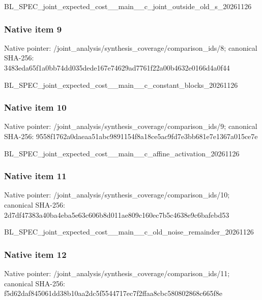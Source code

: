 \documentclass[10pt,a4paper]{article}
\begin{document}
BL\_SPEC\_joint\_expected\_c\allowbreak{}ost\_\_main\_\_c\_joint\_outsi\allowbreak{}de\_old\_s\_20261126


\subsubsection{Native item 9}


Native pointer: /joint\_analysis/synthesi\allowbreak{}s\_coverage/comparison\_id\allowbreak{}s/8; canonical SHA-256: 3483eda65f1a0bb74dd035de\allowbreak{}de167e74629ad7761f22a00b\allowbreak{}4632e0166d4a0f44


BL\_SPEC\_joint\_expected\_c\allowbreak{}ost\_\_main\_\_c\_constant\_bl\allowbreak{}ocks\_20261126


\subsubsection{Native item 10}


Native pointer: /joint\_analysis/synthesi\allowbreak{}s\_coverage/comparison\_id\allowbreak{}s/9; canonical SHA-256: 9558f1762a0daeaa51abc989\allowbreak{}1154f8a18ce5ac9fd7e3bb68\allowbreak{}1e7e1367a015ce7e


BL\_SPEC\_joint\_expected\_c\allowbreak{}ost\_\_main\_\_c\_affine\_acti\allowbreak{}vation\_20261126


\subsubsection{Native item 11}


Native pointer: /joint\_analysis/synthesi\allowbreak{}s\_coverage/comparison\_id\allowbreak{}s/10; canonical SHA-256: 2d7df47383a40ba4eba5e63c\allowbreak{}606b8d011ae809c160ec7b5c\allowbreak{}4638e9c6bafebd53


BL\_SPEC\_joint\_expected\_c\allowbreak{}ost\_\_main\_\_c\_old\_noise\_r\allowbreak{}emainder\_20261126


\subsubsection{Native item 12}


Native pointer: /joint\_analysis/synthesi\allowbreak{}s\_coverage/comparison\_id\allowbreak{}s/11; canonical SHA-256: f5d62daf845061dd38b10aa2\allowbreak{}dc5f5544717ec7f2ffaa8cbc\allowbreak{}580802868c665f8e
\end{document}
